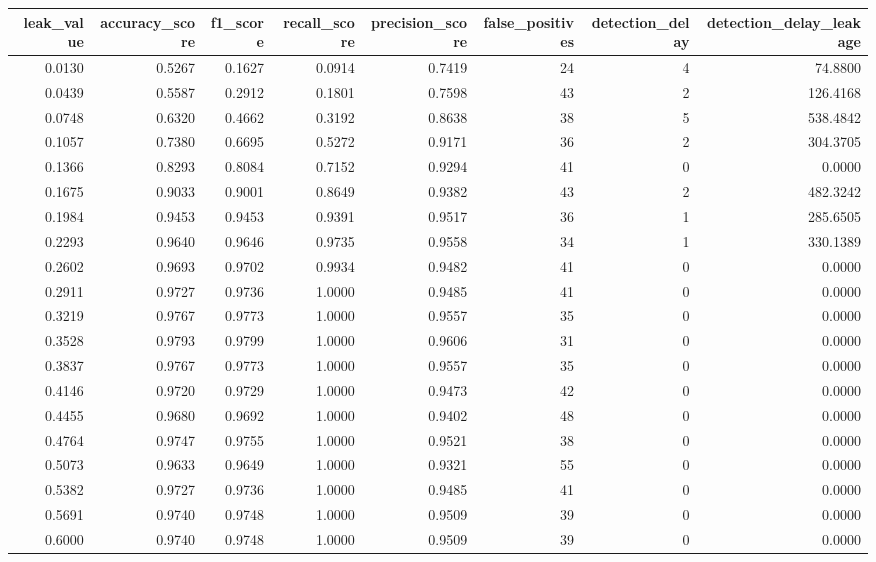 \begin{tabular}{rrrrrrrr}
\toprule
leak\_value & accuracy\_score & f1\_score & recall\_score & precision\_score & false\_positives & detection\_delay & detection\_delay\_leakage \\
\midrule
0.0130 & 0.5267 & 0.1627 & 0.0914 & 0.7419 & 24 & 4 & 74.8800 \\
0.0439 & 0.5587 & 0.2912 & 0.1801 & 0.7598 & 43 & 2 & 126.4168 \\
0.0748 & 0.6320 & 0.4662 & 0.3192 & 0.8638 & 38 & 5 & 538.4842 \\
0.1057 & 0.7380 & 0.6695 & 0.5272 & 0.9171 & 36 & 2 & 304.3705 \\
0.1366 & 0.8293 & 0.8084 & 0.7152 & 0.9294 & 41 & 0 & 0.0000 \\
0.1675 & 0.9033 & 0.9001 & 0.8649 & 0.9382 & 43 & 2 & 482.3242 \\
0.1984 & 0.9453 & 0.9453 & 0.9391 & 0.9517 & 36 & 1 & 285.6505 \\
0.2293 & 0.9640 & 0.9646 & 0.9735 & 0.9558 & 34 & 1 & 330.1389 \\
0.2602 & 0.9693 & 0.9702 & 0.9934 & 0.9482 & 41 & 0 & 0.0000 \\
0.2911 & 0.9727 & 0.9736 & 1.0000 & 0.9485 & 41 & 0 & 0.0000 \\
0.3219 & 0.9767 & 0.9773 & 1.0000 & 0.9557 & 35 & 0 & 0.0000 \\
0.3528 & 0.9793 & 0.9799 & 1.0000 & 0.9606 & 31 & 0 & 0.0000 \\
0.3837 & 0.9767 & 0.9773 & 1.0000 & 0.9557 & 35 & 0 & 0.0000 \\
0.4146 & 0.9720 & 0.9729 & 1.0000 & 0.9473 & 42 & 0 & 0.0000 \\
0.4455 & 0.9680 & 0.9692 & 1.0000 & 0.9402 & 48 & 0 & 0.0000 \\
0.4764 & 0.9747 & 0.9755 & 1.0000 & 0.9521 & 38 & 0 & 0.0000 \\
0.5073 & 0.9633 & 0.9649 & 1.0000 & 0.9321 & 55 & 0 & 0.0000 \\
0.5382 & 0.9727 & 0.9736 & 1.0000 & 0.9485 & 41 & 0 & 0.0000 \\
0.5691 & 0.9740 & 0.9748 & 1.0000 & 0.9509 & 39 & 0 & 0.0000 \\
0.6000 & 0.9740 & 0.9748 & 1.0000 & 0.9509 & 39 & 0 & 0.0000 \\
\bottomrule
\end{tabular}
